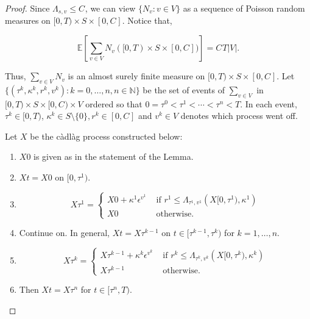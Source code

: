 \documentclass[12pt]{article}
\newcommand{\mb}{\mathbb}
\newcommand{\te}{\text}
\newcommand{\ep}{\epsilon}
\newcommand{\ind}{\hspace{24pt}}
\newcommand{\ex}[1]{\mb{E}\left[#1\right]}			%
\renewcommand{\v}{v}							%
\renewcommand{\S}{S}							%
\newcommand{\ev}[1]{\ep^{#1}}					%
\newcommand{\T}{T}								%
\renewcommand{\t}{t}							%
\renewcommand{\tt}{s}							%
\newcommand{\X}{X}								%
\newcommand{\poiss}[1]{N_{#1}}						%
\newcommand{\V}{V}									%
\renewcommand{\r}{r}								%
\newcommand{\rt}[1]{\tau^{#1}}						%
\renewcommand{\it}{k}								%
\newcommand{\numb}{n}								%
\newcommand{\ratee}[1]{\Lambda_{#1}}				%
\newcommand{\const}[1]{C_{#1}}						%
\renewcommand{\mark}[1]{\kappa^{#1}}				%
\begin{document}
\begin{proof}
Since \(\ratee{\tt,\v} \leq \const{}\), we can view \(\{\poiss{\v}:\v\in\V\}\) as a sequence of Poisson random measures on \([0,\T)\times \S\times [0,\const{}]\). Notice that,

\[\ex{\sum_{\v\in\V}\poiss{\v}([0,\T)\times\S\times[0,\const{}])} = \const{}\T|\V|.\]

Thus, \(\sum_{\v\in\V}\poiss{\v}\) is an almost surely finite measure on \([0,\T)\times \S\times [0,\const{}]\). Let \(\{(\rt{\it},\mark{\it},\r^\it,\v^\it):\it = 0,\dots,\numb, \numb\in \mb{N}\}\) be the set of events of \(\sum_{\v\in\V}\) in \([0,\T)\times\S\times [0,\const{})\times \V\) ordered so that \(0=\rt{0} < \rt{1} < \cdots < \rt{\numb} < \T\). In each event, \(\rt{\it} \in [0,\T)\), \(\mark{\it}\in \S\setminus\{0\}, \r^\it \in [0,\const{}]\) and \(\v^\it \in \V\) denotes which process went off.

\ind Let \(\X{}{}\) be the c\`adl\`ag process constructed below:

\begin{enumerate}
\item \(\X{}{0}\) is given as in the statement of the Lemma.

\item \(\X{}{\t} = \X{}{0}\) on \([0,\rt{1})\).

\item 

\[\X{}{\rt{1}} = \begin{cases}
\X{}{0} + \mark{1}\ev{\v^1} &\te{ if } \r^1 \leq \ratee{\rt{1},\v^1}(\X{}{[0,\rt{1})},\mark{1})\\
\X{}{0} &\te{ otherwise.}
\end{cases}
\] 

\item Continue on. In general, \(\X{}{\t} = \X{}{\rt{\it-1}}\) on \(\t \in [\rt{\it-1},\rt{\it})\) for \(\it= 1,\dots,\numb\).

\item 

\[\X{}{\rt{\it}} = \begin{cases}
\X{}{\rt{\it-1}} + \mark{\it}\ev{\v^\it} &\te{ if } \r^\it \leq \ratee{\rt{\it},\v^\it}(\X{}{[0,\rt{\it})},\mark{\it})\\
\X{}{\rt{\it-1}} &\te{ otherwise.}
\end{cases}\]

\item Then \(\X{}{\t} = \X{}{\rt{\numb}}\) for \(\t\in [\rt{\numb},\T)\).
\end{enumerate}


\end{proof}
\end{document}
